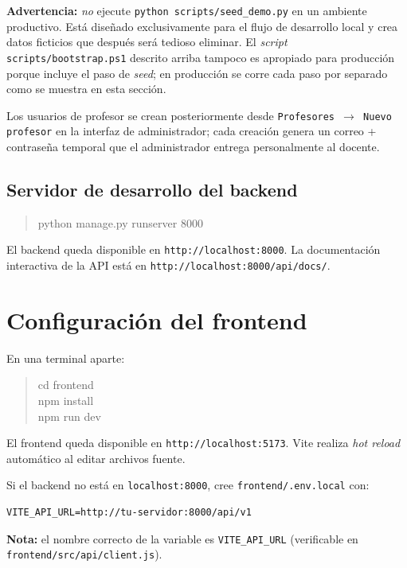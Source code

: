 \documentclass{computacion}
\begin{document}
\textbf{Advertencia:} \emph{no} ejecute \texttt{python scripts/seed\_demo.py} en un ambiente productivo. Está diseñado exclusivamente para el flujo de desarrollo local y crea datos ficticios que después será tedioso eliminar. El \emph{script} \texttt{scripts/bootstrap.ps1} descrito arriba tampoco es apropiado para producción porque incluye el paso de \emph{seed}; en producción se corre cada paso por separado como se muestra en esta sección.

Los usuarios de profesor se crean posteriormente desde \texttt{Profesores $\to$ Nuevo profesor} en la interfaz de administrador; cada creación genera un correo + contraseña temporal que el administrador entrega personalmente al docente.

\subsection{Servidor de desarrollo del backend}

\begin{quote}
\ttfamily
python manage.py runserver 8000
\end{quote}

El backend queda disponible en \texttt{http://localhost:8000}. La documentación interactiva de la API está en \texttt{http://localhost:8000/api/docs/}.

\section{Configuración del frontend}

En una terminal aparte:

\begin{quote}
\ttfamily
cd frontend \\
npm install \\
npm run dev
\end{quote}

El frontend queda disponible en \texttt{http://localhost:5173}. Vite realiza \emph{hot reload} automático al editar archivos fuente.

Si el backend no está en \texttt{localhost:8000}, cree \texttt{frontend/.env.local} con:

\begin{Verbatim}[fontsize=\small, frame=single]
VITE_API_URL=http://tu-servidor:8000/api/v1
\end{Verbatim}

\textbf{Nota:} el nombre correcto de la variable es \texttt{VITE\_API\_URL} (verificable en \texttt{frontend/src/api/client.js}).
\end{document}
